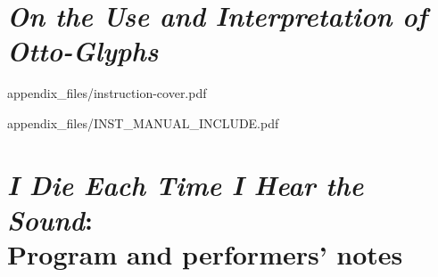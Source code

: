 
\appendix


\chapter{\textit{On the Use and Interpretation of Otto-Glyphs}}


    
    {appendix_files/instruction-cover.pdf}
    
    
    {appendix_files/INST_MANUAL_INCLUDE.pdf}
    

\chapter{\textit{I Die Each Time I Hear the Sound}:\\Program and performers' notes}
    
        

